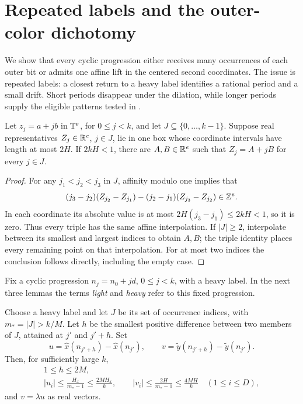 \section{Repeated labels and the outer-color dichotomy}
\label{sec:dichotomy}

We show that every cyclic progression either receives many occurrences
of each outer bit or admits one affine lift in the centered second
coordinates. The issue is repeated labels: a closest return to a heavy
label identifies a rational period and a small drift. Short periods
disappear under the dilation, while longer periods supply the eligible
patterns tested in .

\begin{lemma}\label{dichotomy:affinity}
Let $z_j=a+jb$ in $\mathbb T^e$, for $0\le j<k$, and let
$J\subseteq\{0,\ldots,k-1\}$. Suppose real representatives
$Z_j\in\mathbb R^e$, $j\in J$, lie in one box whose coordinate intervals
have length at most $2H$. If $2kH<1$, there are $A,B\in\mathbb R^e$
such that $Z_j=A+jB$ for every $j\in J$.
\end{lemma}

\begin{proof}
For any $j_1<j_2<j_3$ in $J$, affinity modulo one implies that
\[
 (j_3-j_2)(Z_{j_2}-Z_{j_1})
 -(j_2-j_1)(Z_{j_3}-Z_{j_2})\in\mathbb Z^e.
\]
In each coordinate its absolute value is at most
$2H(j_3-j_1)\le2kH<1$, so it is zero. Thus every triple has the
same affine interpolation. If $|J|\ge2$, interpolate between its
smallest and largest indices to obtain $A,B$; the triple identity
places every remaining point on that interpolation. For at most two
indices the conclusion follows directly, including the empty case.
\end{proof}

Fix a cyclic progression $n_j=n_0+jd$, $0\le j<k$, with a heavy
label. In the next three lemmas the terms \emph{light} and \emph{heavy}
refer to this fixed progression.

\begin{lemma}\label{dichotomy:drift}
Choose a heavy label and let $J$ be its set of occurrence indices,
with $m_*=|J|>k/M$. Let $h$ be the smallest positive difference
between two members of $J$, attained at $j'$ and $j'+h$.
Set
\[
 u=\hat x(n_{j'+h})-\hat x(n_{j'}),\qquad
 v=\tilde y(n_{j'+h})-\tilde y(n_{j'}).
\]
Then, for sufficiently large $k$,
\begin{equation}\label{dichotomy:drift-bounds}
 \begin{gathered}
 1\le h\le2M,\\
 |u_i|\le\frac{H_x}{m_*-1}\le\frac{2MH_x}{k},\qquad
 |v_i|\le\frac{2H}{m_*-1}\le\frac{4MH}{k}
 \quad(1\le i\le D),
 \end{gathered}
\end{equation}
and $v=\lambda u$ as real vectors.
\end{lemma}

